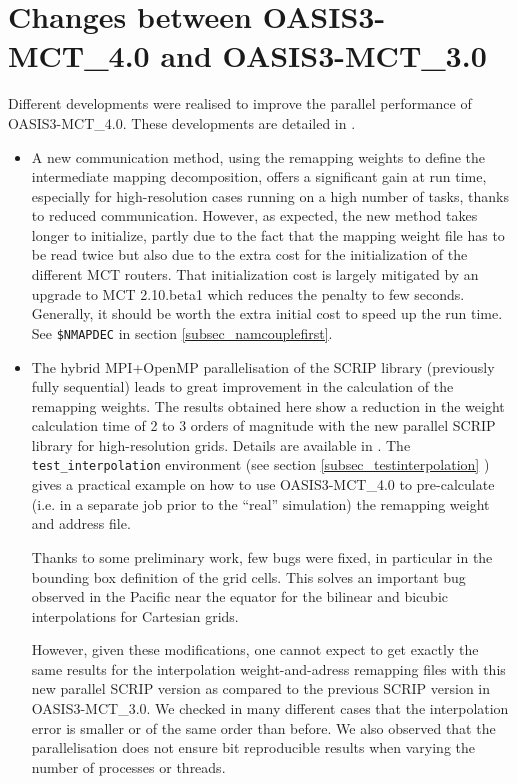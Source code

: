 \section{Changes between OASIS3-MCT\_4.0 and OASIS3-MCT\_3.0}

Different developments were realised to improve the parallel performance of OASIS3-MCT\_4.0. These developments are detailed in \cite{valcke11} .

\begin{itemize}

\item A new communication method, using the remapping weights to define the intermediate mapping decomposition, offers a significant gain at run time, especially for high-resolution cases running on a high number of tasks, thanks to reduced communication. However, as expected, the new method takes longer to initialize, partly due to the fact that the mapping weight file has to be read twice but also due to the extra cost for the initialization of the different MCT routers.  That initialization cost is largely mitigated by an upgrade to MCT 2.10.beta1 which reduces the penalty to few seconds.  Generally, it should be worth the extra initial cost to speed up the run time. See {\tt \$NMAPDEC} in section \ref{subsec_namcouplefirst}.

\item The hybrid MPI+OpenMP parallelisation of the SCRIP library (previously fully sequential) leads to great improvement in the calculation of the remapping weights. The results obtained here show a reduction in the weight calculation time of 2 to 3 orders of magnitude with the new parallel SCRIP library for high-resolution grids. Details are available in \cite{piacentini08}. The {\tt test\_interpolation} environment (see section \ref{subsec_testinterpolation} ) gives a practical example on how to use OASIS3-MCT\_4.0 to pre-calculate (i.e. in a separate job prior to the “real” simulation) the remapping weight and address file.

Thanks to some preliminary work, few bugs were fixed, in particular in the bounding box definition of the grid cells. This solves an important bug observed in the Pacific near the equator for the bilinear and bicubic interpolations for Cartesian grids.

However, given these modifications, one cannot expect to get exactly the same results for the interpolation weight-and-adress remapping files with this new parallel SCRIP version as compared to the previous SCRIP version in OASIS3-MCT\_3.0. We checked in many different cases that the interpolation error is smaller or of the same order than before. We also observed that the parallelisation does not ensure bit reproducible results when varying the number of processes or threads.


\end{itemize}
